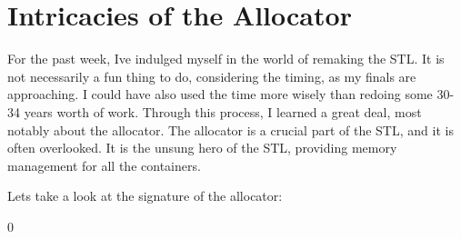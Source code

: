 \chapter{Intricacies of the Allocator }
\hypertarget{md_core_2include_2support_2si_2blog_2intricacies__of__the__allocator}{}\label{md_core_2include_2support_2si_2blog_2intricacies__of__the__allocator}
\label{md_core_2include_2support_2si_2blog_2intricacies__of__the__allocator_autotoc_md2}%
%


For the past week, I\textquotesingle{}ve indulged myself in the world of remaking the STL. It is not necessarily a fun thing to do, considering the timing, as my finals are approaching. I could have also used the time more wisely than redoing some 30-\/34 years\textquotesingle{} worth of work. Through this process, I learned a great deal, most notably about the allocator. The allocator is a crucial part of the STL, and it is often overlooked. It is the unsung hero of the STL, providing memory management for all the containers.

Let\textquotesingle{}s take a look at the signature of the allocator\+:


\begin{DoxyCode}{0}
\DoxyCodeLine{\textcolor{keyword}{public}:}
\DoxyCodeLine{}
\DoxyCodeLine{}
\DoxyCodeLine{}
\DoxyCodeLine{}
\DoxyCodeLine{\};}

\end{DoxyCode}


